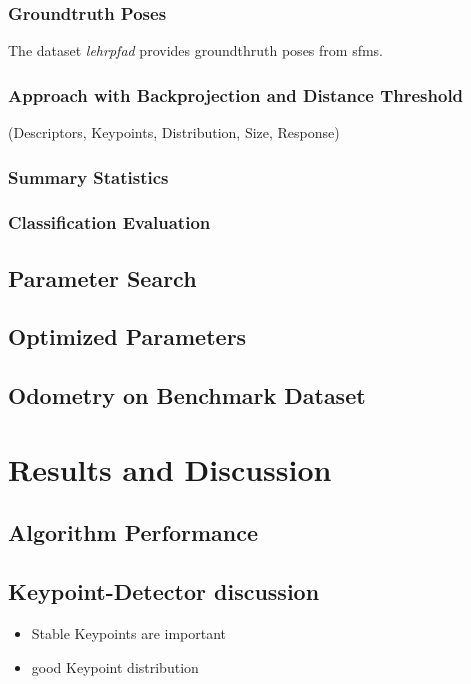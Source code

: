 \subsubsection{Groundtruth Poses}

The dataset \emph{lehrpfad} provides groundthruth poses from \glspl{sfm}.

\subsubsection{Approach with Backprojection and Distance Threshold}

(Descriptors, Keypoints, Distribution, Size, Response)

\subsubsection{Summary Statistics}

\subsubsection{Classification Evaluation}

\subsection{Parameter Search}

\subsection{Optimized Parameters}

\subsection{Odometry on Benchmark Dataset}

\section{Results and Discussion}
\subsection{Algorithm Performance}
\subsection{Keypoint-Detector discussion}

\begin{itemize}
    \item Stable Keypoints are important
    \item good Keypoint distribution
\end{itemize}

